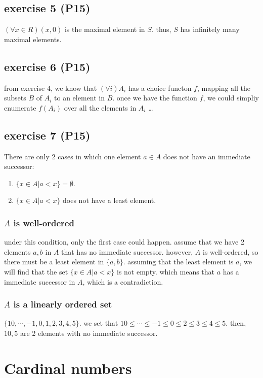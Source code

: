 \documentclass[11pt]{article}
\begin{document}
\subsection{exercise 5 (P15)}
\label{sec:orge21f6e8}
\((\forall x\in R) (x, 0)\) is the maximal element in \(S\).
thus, \(S\) has infinitely many maximal elements.
\subsection{exercise 6 (P15)}
\label{sec:org32e27cc}
from exercise 4, we know that \((\forall i) A_i\) has a choice functon \(f\),
mapping all the subsets \(B\) of \(A_i\) to an element in \(B\).
once we have the function \(f\), we could simpliy enumerate \(f(A_i)\) over
all the elements in \(A_i\) \ldots{}
\subsection{exercise 7 (P15)}
\label{sec:orgfe632dc}
There are only 2 cases in which one element \(a\in A\) does not have an
immediate successor:
\begin{enumerate}
\item \(\{x\in A| a < x\} = \emptyset\).
\item \(\{x\in A| a < x\}\) does not have a least element.
\end{enumerate}
\subsubsection{\(A\) is well-ordered}
\label{sec:orgd00653e}
under this condition, only the first case could happen.
assume that we have 2 elements \(a, b\) in \(A\) that has no immediate successor.
however, \(A\) is well-ordered, so there must be a least element in \(\{a, b\}\).
assuming that the least element is \(a\), we will find that the set \(\{x\in A| a < x\}\) is not empty.
which means that \(a\) has a immediate successor in \(A\), which is a contradiction.
\subsubsection{\(A\) is a linearly ordered set}
\label{sec:org1de34f2}
\(\{10, \cdots, -1, 0, 1, 2, 3, 4, 5\}\).
we set that \(10 \leq \cdots \leq -1 \leq 0 \leq 2 \leq 3 \leq 4 \leq 5\).
then, \(10, 5\) are 2 elements with no immediate successor.
\section{Cardinal numbers}
\label{sec:orgcf97329}
\end{document}
